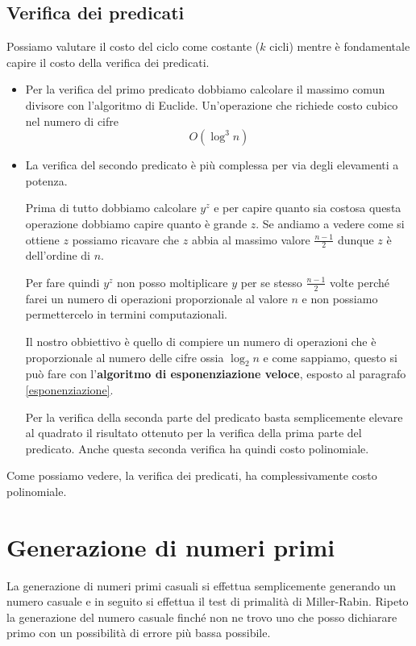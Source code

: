 \subsection{Verifica dei predicati}
Possiamo valutare il costo del ciclo come costante ($k$ cicli) mentre \`e fondamentale capire il costo della verifica
dei predicati.
\begin{itemize}
	\item Per la verifica del primo predicato dobbiamo calcolare il massimo comun divisore con l'algoritmo di Euclide.
	      Un'operazione che richiede costo cubico nel numero di cifre
	      \[ O(\log^3 n) \]
	\item La verifica del secondo predicato \`e pi\`u complessa per via degli elevamenti a potenza.

	      Prima di tutto dobbiamo calcolare $y^z$ e per capire quanto sia costosa questa operazione dobbiamo capire quanto
	      \`e grande $z$. Se andiamo a vedere come si ottiene $z$ possiamo ricavare che $z$ abbia al massimo valore
	      $\frac{n-1}{2}$ dunque $z$ \`e dell'ordine di $n$.

	      Per fare quindi $y^z$ non posso moltiplicare $y$ per se stesso $\frac{n-1}{2}$ volte perch\'e farei un numero
	      di operazioni proporzionale al valore $n$ e non possiamo permettercelo in termini computazionali.

	      Il nostro obbiettivo \`e quello di compiere un numero di operazioni che \`e proporzionale al numero delle cifre
	      ossia $\log_2 n$ e come sappiamo, questo si pu\`o fare con l'\textbf{algoritmo di esponenziazione veloce},
	      esposto al paragrafo \ref{esponenziazione}.

	      Per la verifica della seconda parte del predicato basta semplicemente elevare al quadrato il risultato ottenuto
	      per la verifica della prima parte del predicato. Anche questa seconda verifica ha quindi costo polinomiale.
\end{itemize}
Come possiamo vedere, la verifica dei predicati, ha complessivamente costo polinomiale.

\section{Generazione di numeri primi}\label{generazione_primi}
La generazione di numeri primi casuali si effettua semplicemente generando un numero casuale e in seguito si effettua
il test di primalit\`a di Miller-Rabin. Ripeto la generazione del numero casuale finch\'e non ne trovo uno che posso
dichiarare primo con un possibilit\`a di errore pi\`u bassa possibile.

